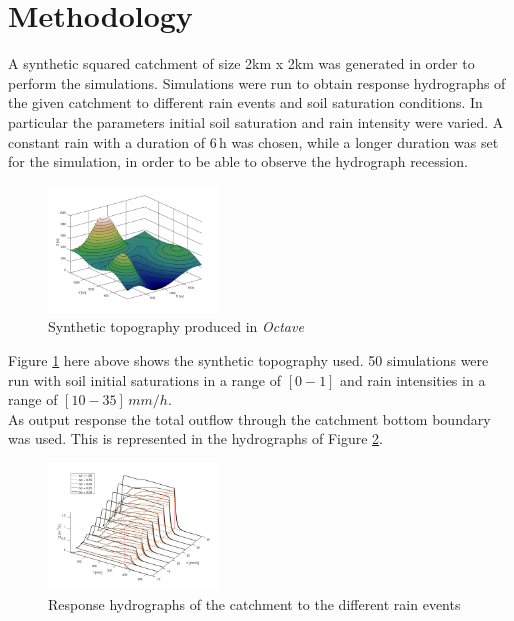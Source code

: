 \documentclass[12pt,a4paper,twocolumn,fleqn]{narms}
\begin{document}
\section{Methodology}

A synthetic squared catchment of size 2km x 2km was generated in order to
perform the simulations. Simulations were run to obtain response hydrographs of
the given catchment to different rain events and soil saturation conditions.
In particular the parameters initial soil saturation and rain intensity were
varied. A constant rain with a duration of 6\,h was chosen, while a longer
duration was set for the simulation, in order to be able to observe the
hydrograph recession.

\begin{figure}[t]
  \centering
  \includegraphics[width=0.4\textwidth]{img/topography.png}
  \caption{Synthetic topography produced in \textit{Octave} \cite{noauthor_gnu_nodate}}
  \label{img:topography}
\end{figure}

Figure \ref{img:topography} here above shows the synthetic topography used.
50 simulations were run with soil initial saturations in a range of $[0 - 1]$
and rain intensities in a range of $[10 - 35]\,mm/h$.\\

As output response the total outflow through the catchment bottom boundary was used.
This is represented in the hydrographs of Figure \ref{img:hydrographs}.

\begin{figure}[t]
  \centering
  \includegraphics[width=0.4\textwidth]{img/hydrographs3d.png}
  \caption{Response hydrographs of the catchment to the different rain events}
  \label{img:hydrographs}
\end{figure}
\end{document}
